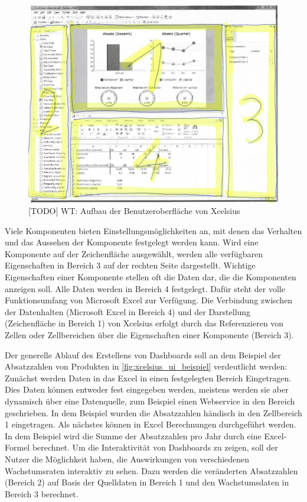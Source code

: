 \begin{figure}[h]
\centering
\setlength{\unitlength}{1mm}
\includegraphics[width=15cm]{images/Xcelsius_UI_Aufbau.jpg}
\caption{[TODO] WT: Aufbau der Benutzeroberfläche von Xcelsius\label{fig:xcelsius_ui_aufbau}}
\end{figure}

Viele Komponenten bieten Einstellungsmöglichkeiten an, mit denen das Verhalten und das Aussehen der Komponente festgelegt werden kann. Wird eine Komponente auf der Zeichenfläche ausgewählt, werden alle verfügbaren Eigenschaften in Bereich 3 auf der rechten Seite dargestellt. Wichtige Eigenschaften einer Komponente stellen oft die Daten dar, die die Komponenten anzeigen soll. Alle Daten werden in Bereich 4 festgelegt. Dafür steht der volle Funktionsumfang von Microsoft Excel zur Verfügung. Die Verbindung zwischen der Datenhalten (Microsoft Excel in Bereich 4) und der Darstellung (Zeichenfläche in Bereich 1) von Xcelsius erfolgt durch das Referenzieren von Zellen oder Zellbereichen über die Eigenschaften einer Komponente (Bereich 3).


Der generelle Ablauf des Erstellens von Dashboards soll an dem Beispiel der Absatzzahlen von Produkten in \vref{fig:xcelsius_ui_beispiel} verdeutlicht werden: Zunächst werden Daten in das Excel in einen festgelegten Bereich Eingetragen. Dies Daten können entweder fest eingegeben werden, meistens werden sie aber dynamisch über eine Datenquelle, zum Beispiel einen Webservice in den Bereich geschrieben. In dem Beispiel wurden die Absatzzahlen händisch in den Zellbereich 1 eingetragen. Als nächstes können in Excel Berechnungen durchgeführt werden. In dem Beispiel wird die Summe der Absatzzahlen pro Jahr durch eine Excel-Formel berechnet. Um die Interaktivität von Dashboards zu zeigen, soll der Nutzer die Möglichkeit haben, die Auswirkungen von verschiedenen Wachstumsraten interaktiv zu sehen. Dazu werden die veränderten Absatzzahlen (Bereich 2) auf Basis der Quelldaten in Bereich 1 und den Wachstumsdaten in Bereich 3 berechnet.


